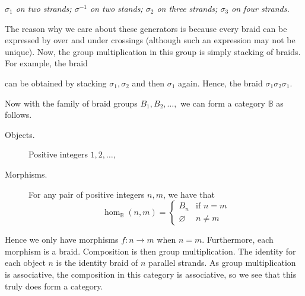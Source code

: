 \begin{example}
\begin{center}
            \emph{$\sigma_1$ on two strands; $\sigma^{-1}$ on two stands; $\sigma_2$ on three strands; $\sigma_3$ on four strands.}
        \end{center}
        The reason why we care about these generators is because every braid can be expressed 
        by over and under crossings (although such an expression may not be unique).
        Now, the group multiplication in this group is simply stacking of braids. For example, the braid
        \begin{center}
            \def\nstrands{4}
            \def\xcoord{0}
        \end{center}
        can be obtained by stacking $\sigma_1, \sigma_2$ and then $\sigma_1$ again. 
        Hence, the  braid $\sigma_1\sigma_2\sigma_1$. 

        Now with the family of braid groups $B_1, B_2, \dots,$ we can form a category $\mathbb{B}$
        as follows. 
        \begin{description}
            \item[Objects.] Positive integers $1,2, \dots,$
            \item[Morphisms.] For any pair of positive integers $n,m$, we have that 
            \[
                \hom_{\mathbb{B}}(n,m) = 
                \begin{cases}
                    B_n & \text{if } n = m\\
                    \varnothing & n \ne m
                \end{cases}
            \]
        \end{description}
        Hence we only have morphisms $f: n \to m$ when $n = m$. Furthermore, each 
        morphism is a braid. Composition is then group multiplication. The identity for each 
        object $n$ is the identity braid of $n$ parallel strands. As group multiplication 
        is associative, the composition in this category is associative, so we see that this truly 
        does form a category. 
    \end{example}

